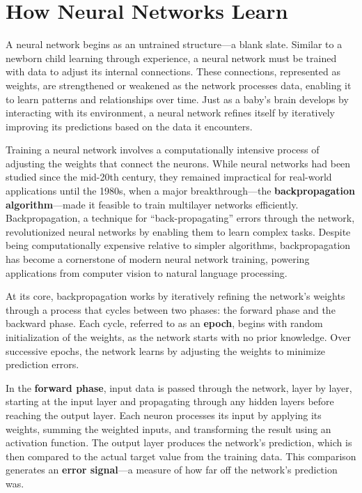 \documentclass[
]{book}
\theoremstyle{definition}
\theoremstyle{definition}
\theoremstyle{definition}
\theoremstyle{definition}
\theoremstyle{remark}
\begin{document}
\section{How Neural Networks Learn}\label{how-neural-networks-learn}

A neural network begins as an untrained structure---a blank slate. Similar to a newborn child learning through experience, a neural network must be trained with data to adjust its internal connections. These connections, represented as weights, are strengthened or weakened as the network processes data, enabling it to learn patterns and relationships over time. Just as a baby's brain develops by interacting with its environment, a neural network refines itself by iteratively improving its predictions based on the data it encounters.

Training a neural network involves a computationally intensive process of adjusting the weights that connect the neurons. While neural networks had been studied since the mid-20th century, they remained impractical for real-world applications until the 1980s, when a major breakthrough---the \textbf{backpropagation algorithm}---made it feasible to train multilayer networks efficiently. Backpropagation, a technique for ``back-propagating'' errors through the network, revolutionized neural networks by enabling them to learn complex tasks. Despite being computationally expensive relative to simpler algorithms, backpropagation has become a cornerstone of modern neural network training, powering applications from computer vision to natural language processing.

At its core, backpropagation works by iteratively refining the network's weights through a process that cycles between two phases: the forward phase and the backward phase. Each cycle, referred to as an \textbf{epoch}, begins with random initialization of the weights, as the network starts with no prior knowledge. Over successive epochs, the network learns by adjusting the weights to minimize prediction errors.

In the \textbf{forward phase}, input data is passed through the network, layer by layer, starting at the input layer and propagating through any hidden layers before reaching the output layer. Each neuron processes its input by applying its weights, summing the weighted inputs, and transforming the result using an activation function. The output layer produces the network's prediction, which is then compared to the actual target value from the training data. This comparison generates an \textbf{error signal}---a measure of how far off the network's prediction was.
\end{document}

